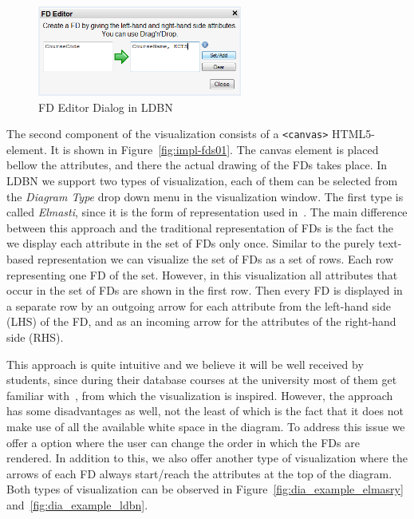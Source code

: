 \begin{figure}[h]
	\begin{center}
		\includegraphics[width=0.6\textwidth]{./img/fdeditor.png}
		\caption{FD Editor Dialog in LDBN}
		\label{fig:fdeditor}
	\end{center}
\end{figure}

The second component of the visualization consists of a \verb=<canvas>= HTML5-element. 
It is shown in Figure~\ref{fig:impl-fds01}.
The canvas element is placed bellow the attributes, and there the actual drawing 
of the FDs takes place. In LDBN we support two types of visualization, each of them can be selected
from the \emph{Diagram Type} drop down menu in the visualization window. The first type is called 
\emph{Elmasti}, since it is the form of representation used in~\cite{bdb1}. 
The main difference between this approach and
the traditional representation of FDs is the fact the we display each attribute in the set of 
FDs only once. 
Similar to the purely text-based representation we can visualize the set
of FDs as a set of rows. Each row representing one FD of the set. 
However, in this visualization all attributes that occur in the set of FDs
are shown in the first row. Then every FD is displayed in a separate row by an outgoing 
arrow for each attribute from the left-hand side (LHS) of the FD,
and as an incoming arrow for the attributes of the right-hand side (RHS).

This approach is quite intuitive and we believe it will be well received by
students, since during their database courses at the university most of 
them get familiar with~\cite{bdb1}, from which
the visualization is inspired. However, the approach has some disadvantages
as well, not the least of which is the fact that it does not make use
of all the available white space in the diagram. To address this issue
we offer a option where the user can change the order in which
the FDs are rendered. In addition to this, we also offer another type of
visualization where the arrows of each FD always start/reach the 
attributes at the top of the diagram. 
Both types of visualization can be observed in 
Figure~\ref{fig:dia_example_elmasry} and~\ref{fig:dia_example_ldbn}.

